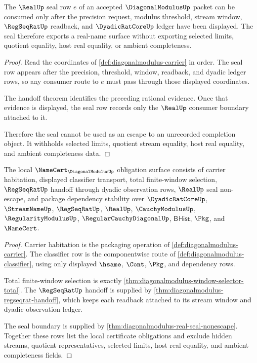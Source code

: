 \begin{theorem}
\label{thm:diagonalmodulus-real-seal-nonescape}
The $\RealUp$ seal row $e$ of an accepted $\DiagonalModulusUp$ packet can be consumed only after the precision request, modulus threshold, stream window, $\RegSeqRatUp$ readback, and $\DyadicRatCoreUp$ ledger have been displayed. The seal therefore exports a real-name surface without exporting selected limits, quotient equality, host real equality, or ambient completeness.
\end{theorem}
\begin{proof}
Read the coordinates of \autoref{def:diagonalmodulus-carrier} in order. The seal row appears after the precision, threshold, window, readback, and dyadic ledger rows, so any consumer route to $e$ must pass through those displayed coordinates.

The handoff theorem identifies the preceding rational evidence. Once that evidence is displayed, the seal row records only the $\RealUp$ consumer boundary attached to it.

Therefore the seal cannot be used as an escape to an unrecorded completion object. It withholds selected limits, quotient stream equality, host real equality, and ambient completeness data.
\end{proof}

\begin{theorem}
\label{thm:diagonalmodulus-namecert-obligation-surface}
The local $\NameCert_{\DiagonalModulusUp}$ obligation surface consists of carrier habitation, displayed classifier transport, total finite-window selection, $\RegSeqRatUp$ handoff through dyadic observation rows, $\RealUp$ seal non-escape, and package dependency stability over $\DyadicRatCoreUp$, $\StreamNameUp$, $\RegSeqRatUp$, $\RealUp$, $\CauchyModulusUp$, $\RegularityModulusUp$, $\RegularCauchyDiagonalUp$, $\mathsf{BHist}$, $\Pkg$, and $\NameCert$.
\end{theorem}
\begin{proof}
Carrier habitation is the packaging operation of \autoref{def:diagonalmodulus-carrier}. The classifier row is the componentwise route of \autoref{def:diagonalmodulus-classifier}, using only displayed $\hsame$, $\Cont$, $\Pkg$, and dependency rows.

Total finite-window selection is exactly \autoref{thm:diagonalmodulus-window-selector-total}. The $\RegSeqRatUp$ handoff is supplied by \autoref{thm:diagonalmodulus-regseqrat-handoff}, which keeps each readback attached to its stream window and dyadic observation ledger.

The seal boundary is supplied by \autoref{thm:diagonalmodulus-real-seal-nonescape}. Together these rows list the local certificate obligations and exclude hidden streams, quotient representatives, selected limits, host real equality, and ambient completeness fields.
\end{proof}

